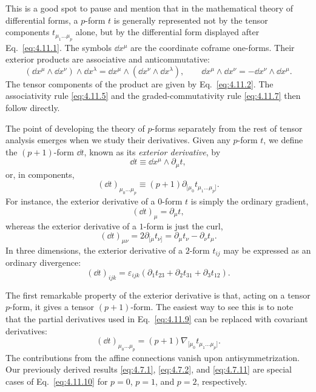 This is a good spot to pause and mention that in the mathematical theory of
differential forms, a \(p\)-form \(t\) is generally represented not by the
tensor components \(t_{\mu_1\ldots\mu_p}\) alone, but by the differential
form displayed after Eq.~\eqref{eq:4.11.1}. The symbols
\(\dd x^\mu\) are the coordinate coframe one-forms. Their exterior products
are associative and anticommutative:
\[
  (\dd x^\mu\wedge\dd x^\nu)\wedge\dd x^\lambda
  =
  \dd x^\mu\wedge(\dd x^\nu\wedge\dd x^\lambda),
  \qquad
  \dd x^\mu\wedge\dd x^\nu
  =
  -\dd x^\nu\wedge\dd x^\mu.
\]
The tensor components of the product are given by
Eq.~\eqref{eq:4.11.2}. The associativity rule \eqref{eq:4.11.5} and the
graded-commutativity rule \eqref{eq:4.11.7} then follow directly.

The point of developing the theory of \(p\)-forms separately from the rest
of tensor analysis emerges when we study their derivatives. Given any
\(p\)-form \(t\), we define the \((p+1)\)-form \(\dd t\), known as its
\textit{exterior derivative}, by
\begin{equation}
  \dd t
  \equiv
  \dd x^\mu\wedge\partial_\mu t,
  \tag{4.11.8}\label{eq:4.11.8}
\end{equation}
or, in components,
\begin{equation}
  (\dd t)_{\mu_0\ldots\mu_p}
  \equiv
  (p+1)\partial_{[\mu_0}t_{\mu_1\ldots\mu_p]}.
  \tag{4.11.9}\label{eq:4.11.9}
\end{equation}
For instance, the exterior derivative of a \(0\)-form \(t\) is simply the
ordinary gradient,
\[
  (\dd t)_\mu=\partial_\mu t,
\]
whereas the exterior derivative of a \(1\)-form is just the curl,
\[
  (\dd t)_{\mu\nu}
  =
  2\partial_{[\mu}t_{\nu]}
  =
  \partial_\mu t_\nu-\partial_\nu t_\mu.
\]
In three dimensions, the exterior derivative of a \(2\)-form \(t_{ij}\) may
be expressed as an ordinary divergence:
\[
  (\dd t)_{ijk}
  =
  \varepsilon_{ijk}
  \left(
    \partial_1t_{23}
    +\partial_2t_{31}
    +\partial_3t_{12}
  \right).
\]

The first remarkable property of the exterior derivative is that, acting on
a tensor \(p\)-form, it gives a tensor \((p+1)\)-form. The easiest way to see
this is to note that the partial derivatives used in
Eq.~\eqref{eq:4.11.9} can be replaced with covariant derivatives:
\begin{equation}
  (\dd t)_{\mu_0\ldots\mu_p}
  =
  (p+1)\nabla_{[\mu_0}t_{\mu_1\ldots\mu_p]}.
  \tag{4.11.10}\label{eq:4.11.10}
\end{equation}
The contributions from the affine connections vanish upon
antisymmetrization. Our previously derived results
\eqref{eq:4.7.1}, \eqref{eq:4.7.2}, and \eqref{eq:4.7.11} are special
cases of Eq.~\eqref{eq:4.11.10} for \(p=0\), \(p=1\), and \(p=2\),
respectively.

